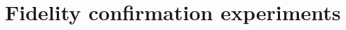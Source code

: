 \documentclass[sigconf]{acmart}
\begin{document}
%
%
%
%
%
%
%
%
%
%
%
%
%


\section{Fidelity confirmation experiments}\label{Sec:Experiments}


\end{document}
